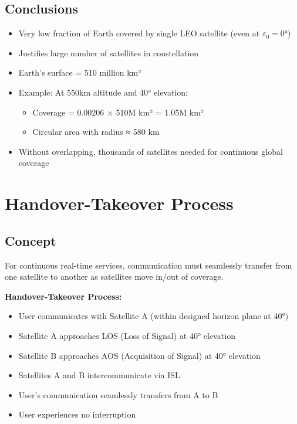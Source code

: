 \documentclass[11pt,letterpaper]{article}
\begin{document}
\subsection{Conclusions}
\begin{itemize}
    \item Very low fraction of Earth covered by single LEO satellite (even at $\varepsilon_0 = 0°$)
    \item Justifies large number of satellites in constellation
    \item Earth's surface = 510 million km²
    \item Example: At 550km altitude and 40° elevation:
    \begin{itemize}
        \item Coverage = 0.00206 × 510M km² = 1.05M km²
        \item Circular area with radius ≈ 580 km
    \end{itemize}
    \item Without overlapping, thousands of satellites needed for continuous global coverage
\end{itemize}

\section{Handover-Takeover Process}

\subsection{Concept}
For continuous real-time services, communication must seamlessly transfer from one satellite to another as satellites move in/out of coverage.

\textbf{Handover-Takeover Process:}
\begin{itemize}
    \item User communicates with Satellite A (within designed horizon plane at 40°)
    \item Satellite A approaches LOS (Loss of Signal) at 40° elevation
    \item Satellite B approaches AOS (Acquisition of Signal) at 40° elevation
    \item Satellites A and B intercommunicate via ISL
    \item User's communication seamlessly transfers from A to B
    \item User experiences no interruption
\end{itemize}
\end{document}
